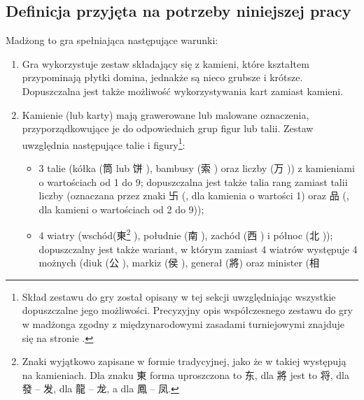 \def \traditionalstonesfootnote {\getrefnumber{definicja_tradycyjne}} %
\subsection{Definicja przyjęta na potrzeby niniejszej pracy}
\label{definicja}
Madżong to gra spełniająca %
następujące warunki:

\begin{enumerate}[label={\alph*)}] \item Gra wykorzystuje zestaw składający się
z kamieni, które kształtem przypominają płytki domina, jednakże są nieco grubsze
i krótsze. Dopuszczalna jest także możliwość wykorzystywania kart zamiast
kamieni.
\item Kamienie (lub karty) mają grawerowane lub malowane oznaczenia,
przyporządkowujące je do odpowiednich grup figur lub talii. Zestaw uwzględnia
następujące talie i figury\footnote{Skład zestawu do gry został opisany w tej
sekcji uwzględniając wszystkie dopuszczalne jego możliwości.
Precyzyjny opis współczesnego zestawu do gry w madżonga zgodny z
międzynarodowymi zasadami turniejowymi znajduje się  na stronie
\pageref{guobiao_zestaw}.}:
	\begin{itemize}
	  \item 3 talie (kółka (筒  lub 饼 ), bambusy (索
	  ) oraz liczby (万 )) z kamieniami o
wartościach od 1 do 9; dopuszczalna jest także talia rang zamiast talii liczby
(oznaczana przez znaki 卐 (, dla kamienia o wartości 1) oraz 品 
(, dla kamieni o wartościach od 2 do 9)); 
\item 4 wiatry \label{wiatry}
(wschód(東\footnote{\label{definicja_tradycyjne}Znaki wyjątkowo zapisane w formie
tradycyjnej, jako że w takiej występują na kamieniach. Dla znaku 東  forma
uproszczona to 东, dla 將 jest to 将, dla 發 -- 发, dla 龍 -- 龙, a dla 鳳 -- 凤.}
), południe (南 ), zachód (西 ) i północ (北
));  dopuszczalny jest także wariant, w którym zamiast 4 wiatrów
występuje 4 możnych (diuk (公 ),  markiz (侯 ),  generał
(將\footnotemark[\traditionalstonesfootnote] ) oraz minister (相

\end{itemize}
\end{enumerate}
